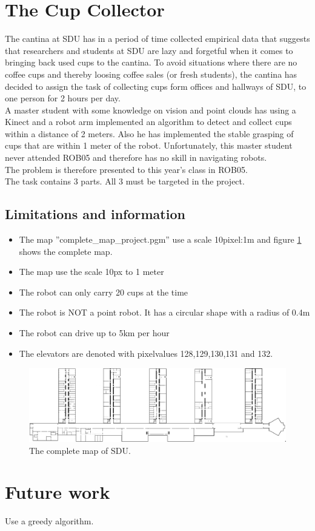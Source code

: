 \documentclass[11pt,a4paper]{article}
\begin{document}
\section{The Cup Collector}
The cantina at SDU has in a period of time collected empirical data that suggests that researchers and students at SDU are lazy and forgetful when it comes to bringing back used cups to the cantina. To avoid situations where there are no coffee cups and thereby loosing coffee sales (or fresh students), the cantina has decided to assign the task of collecting cups form offices and hallways of SDU, to one person for 2 hours per day.\\[0.2cm]
A master student with some knowledge on vision and point clouds has using a Kinect and a robot arm implemented an algorithm to detect and collect cups within a distance of 2 meters. Also he has implemented the stable grasping of cups that are within 1 meter of the robot. Unfortunately, this master student never attended ROB05 and therefore has no skill in navigating robots.\\[0.2cm]
The problem is therefore presented to this year’s class in ROB05.\\[0.2cm]
The task contains 3 parts. All 3 must be targeted in the project.

\subsection{Limitations and information}
\begin{itemize}
\item The map ”complete\_map\_project.pgm” use a scale 10pixel:1m and figure \ref{fig::original} shows the complete map. 
\item The map use the scale 10px to 1 meter
\item The robot can only carry 20 cups at the time
\item The robot is NOT a point robot. It has a circular shape with a radius of 0.4m
\item The robot can drive up to 5km per hour
\item The elevators are denoted with pixelvalues 128,129,130,131 and 132.
\end{itemize}

\begin{figure}[H]
\centering
\includegraphics[scale=0.33]{img/original.png}
\caption{The complete map of SDU.}
\label{fig::original}
\end{figure}

\newpage


\newpage


\newpage


\newpage

\section{Future work}
Use a greedy algorithm. 
\end{document}
